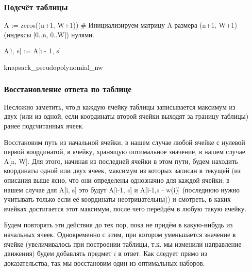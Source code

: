 \documentclass{article}
\begin{document}
	\subsubsection{Подсчёт таблицы}
	\begin{algorithm}[H]
		\SetAlgoLined %
		
		A := zeros((n+1, W+1))    \# Инициализируем матрицу A размера (n+1, W+1) (индексы [0..n, 0..W]) нулями.
		
		 {
			 {
				A[i, s] := A[i - 1, s]
				
				\If {$(w(i) \leq s)$ and $(A[i, s] > A[i - 1, s - w(i)] + c(i))$}{
					A[i, s] := A[i - 1, s - w(i)]] + c(i)
				}
			}
		}
		
	\caption{knapsack\_pseudopolynomial\_nw}
\end{algorithm}


\subsubsection{Восстановление ответа по таблице}

Несложно заметить, что,в каждую ячейку таблицы записывается максимум из двух (или из одной, если координаты второй ячейки выходят за границу таблицы) ранее подсчитанных ячеек.

Восстановим путь из начальной ячейки, в нашем случае любой ячейке с нулевой первой координатой, в ячейку, хранящую оптимальное значение, в нашем случае A[n, W]. Для этого, начиная из последней ячейки в этом пути, будем находить координаты одной или двух ячеек, максимум из которых записан в текущей (из описания выше ясно, что они определены однозначно для каждой ячейки; в нашем случае для A[i, s] это будут A[i-1, s] и A[i-1,s - w(i)] (последнюю нужно учитывать только если её координаты неотрицательны)) и смотреть, в каких ячейках достигается этот максимум, после чего перейдём в любую такую ячейку. 

Будем повторять эти действия до тех пор, пока не придём в какую-нибудь из начальных ячеек. Одновременно с этим, при котором уменьшается значение в ячейке (увеличивалось при построении таблицы, т.к. мы изменили направление движения) будем добавлять предмет $i$ в ответ. Как следует прямо из доказательства, так мы восстановим один из оптимальных наборов.  
\end{document}
